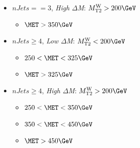 \begin{itemize}
  \item $nJets==3$, \textit{High $\Delta$M}: $\MTtW>200\GeV$
  \begin{itemize}
    \item $\MET>350 \GeV$
  \end{itemize}
  \item $nJets\ge4$, \textit{Low $\Delta$M}: $\MTtW<200\GeV$
  \begin{itemize}
     \item $250<\MET<325 \GeV$
     \item $\MET>325 \GeV$
  \end{itemize}
  \item $nJets\ge4$, \textit{High $\Delta$M}: $\MTtW>200\GeV$
  \begin{itemize}
     \item $250<\MET<350 \GeV$
     \item $350<\MET<450 \GeV$
     \item $\MET>450 \GeV$
  \end{itemize}
\end{itemize}

